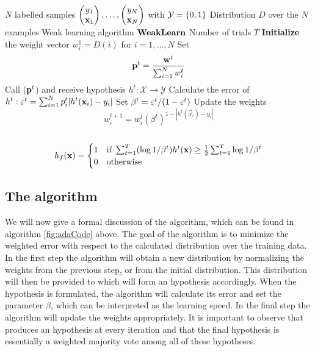 \begin{algorithm} 
\caption{\adaB}
\label{fig:adaCode}
	\begin{algorithmic}[1]
	\Require 
	\Statex $N$ labelled samples $\Vec{y_1\\ \mathbf x_1},\ldots,\Vec{y_N\\ \mathbf x_N}$  with $\mathcal Y = \set{0,1}$ 
	\Statex Distribution $D$ over the $N$ examples
	\Statex Weak learning algorithm $\weak$
	\Statex Number of trials $T$
	\State \textbf{Initialize} the weight vector $w_i^1=D(i)$ for $i=1,\ldots,N$
	\State Set $$\bf p^t= \frac{\bf w^t}{\sum_{i=1}^N w^t_i}$$
	\State Call \weak($\bf p^t$) and receive hypothesis $h^t:\mathcal X\to\mathcal Y$
	\State Calculate the error of $h^t:\ve^t=\sum^N_{i=1}p^t_i|h^t(\mathbf x_i)-y_i|$\label{algStep:adaErr}
	\State Set $\b^t=\ve^t/(1-\ve^t)$
	\State Update the weights $$w_i^{t+1}=w_i^t(\beta^t)^{1-|h^t(\vec x_i)-y_i|}$$
	\EndFor\\
	\Return $$h_f(\mathbf x)=\begin{cases}1 & \text{if } \sum^T_{t=1}(\log1/\b^t)h^t(\mathbf x)\geq\frac12\sum^T_{t=1}\log1/\b^t\\0&\text{otherwise}\end{cases}$$
	\EndProcedure
	\end{algorithmic}
\end{algorithm}
\vspace{-5pt}
\subsection{The algorithm}
\label{subsec:AdaAlgo}
We will now give a formal discussion of the \adaB\cite{Freund1997} algorithm, which can be found in algorithm \ref{fig:adaCode} above. The goal of the algorithm is to minimize the weighted error with respect to the calculated distribution 
over the training data. In the first step the algorithm will obtain a new distribution by normalizing the weights from the previous step, or from the initial distribution. This distribution will then be provided to \weak which will form an hypothesis accordingly. When the hypothesis is formulated, the algorithm will calculate its error and set the parameter $\beta$, which can be interpreted as the learning speed. In the final step the algorithm will update the weights appropriately. It is important to observe that \weak produces an hypothesis at every iteration and that the final hypothesis is essentially a weighted majority vote among all of these hypotheses. \par

